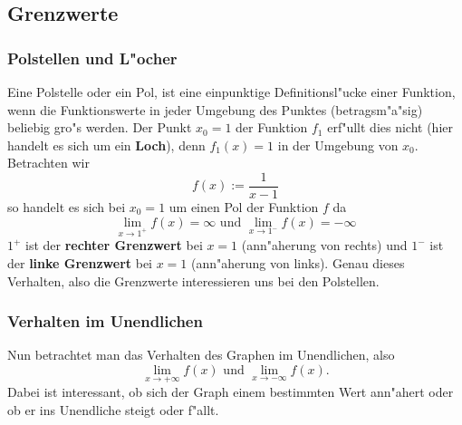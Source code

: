 \subsection{Grenzwerte} \label{sec:grenzwerte}
\subsubsection{Polstellen und L"ocher}
Eine Polstelle oder ein Pol, ist eine einpunktige Definitionsl"ucke einer Funktion, wenn die Funktionswerte in jeder Umgebung des Punktes (betragsm"a"sig) beliebig gro"s werden. Der Punkt $x_0 = 1$ der Funktion $f_1$ erf"ullt dies nicht (hier handelt es sich um ein \textbf{Loch}), denn $f_1(x) = 1$ in der Umgebung von $x_0$. Betrachten wir 
\begin{equation*}
f(x) := \frac{1}{x-1}
\end{equation*}
so handelt es sich bei $x_0 = 1$ um einen Pol der Funktion $f$ da
\begin{equation*}
\lim\limits_{x \to 1^+} f(x) = \infty \text{ und } \lim\limits_{x \to 1^-} f(x) = -\infty
\end{equation*}
$1^+$ ist der \textbf{rechter Grenzwert} bei $x=1$ (ann"aherung von rechts) und $1^-$ ist der \textbf{linke Grenzwert} bei $x=1$ (ann"aherung von links). Genau dieses Verhalten, also die Grenzwerte interessieren uns bei den Polstellen.

\subsubsection{Verhalten im Unendlichen}
Nun betrachtet man das Verhalten des Graphen im Unendlichen, also
\begin{equation*}
\lim\limits_{x \to +\infty} f(x) \text{ und } \lim\limits_{x \to -\infty} f(x) .
\end{equation*}
 Dabei ist interessant, ob sich der Graph einem bestimmten Wert ann"ahert oder ob er ins Unendliche steigt oder f"allt.

